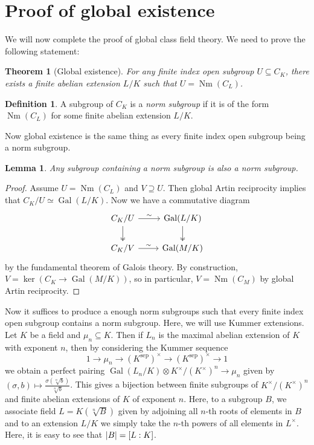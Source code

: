 \documentclass[leqno, openany]{memoir}
\newtheorem{lem}[thm]{Lemma}
\theoremstyle{definition}
\newtheorem{defn}[thm]{Definition}
\theoremstyle{remark}
\theoremstyle{plain}
\newtheorem*{thm*}{Theorem}
\theoremstyle{definition}
\theoremstyle{remark}
\newcommand{\mr}[1]{\mathrm{#1}}
\DeclareMathOperator{\Gal}{Gal}
\DeclareMathOperator{\Nm}{Nm}
\begin{document}
\section{Proof of global existence}%

We will now complete the proof of global class field theory. We need to prove
the following statement: \begin{thm*}[Global existence] For any finite index
    open subgroup $U \subseteq C_K$, there exists a finite abelian extension
    $L/K$ such that $U = \Nm(C_L)$.  \end{thm*}

\begin{defn} A subgroup of $C_K$ is a \textit{norm subgroup} if it is of the
form $\Nm(C_L)$ for some finite abelian extension $L/K$.  \end{defn}

Now global existence is the same thing as every finite index open subgroup
being a norm subgroup. 

\begin{lem} Any subgroup containing a norm subgroup is also a norm subgroup.
\end{lem}

\begin{proof} Assume $U = \Nm(C_L)$ and $V \supseteq U$. Then global Artin
    reciprocity implies that $C_K/U \simeq \Gal(L/K)$. Now we have a
    commutative diagram \begin{equation*} \begin{tikzcd} C_K/U \ar{r}{\sim}
        \ar[twoheadrightarrow]{d} & \Gal(L/K) \ar[twoheadrightarrow]{d} \\
    C_K/V \ar{r}{\sim} & \Gal(M/K) \end{tikzcd} \end{equation*} by the
    fundamental theorem of Galois theory. By construction, $V = \ker(C_K \to
    \Gal(M/K))$, so in particular, $V = \Nm(C_M)$ by global Artin reciprocity.
\end{proof}

Now it suffices to produce a enough norm subgroups such that every finite index
open subgroup contains a norm subgroup. Here, we will use Kummer extensions.
Let $K$ be a field and $\mu_n \subseteq K$. Then if $L_n$ is the maximal
abelian extension of $K$ with exponent $n$, then by considering the Kummer
sequence \[ 1 \to \mu_n \to {(K^{\mr{sep}})}^{\times} \to
{(K^{\mr{sep}})}^{\times} \to 1 \] we obtain a perfect pairing $\Gal(L_n/K)
\otimes K^{\times}/{(K^{\times})}^n \to \mu_n$ given by $(\sigma, b) \mapsto
\frac{\sigma(\sqrt[n]{b})}{\sqrt[n]{b}}$. This gives a bijection between finite
subgroups of $K^{\times}/{(K^{\times})}^n$ and finite abelian extensions of $K$
of exponent $n$. Here, to a subgroup $B$, we associate field $L =
K(\sqrt[n]{B})$ given by adjoining all $n$-th roots of elements in $B$ and to
an extension $L/K$ we simply take the $n$-th powers of all elements in
$L^{\times}$. Here, it is easy to see that $\abs{B} = [L:K]$.
\end{document}

